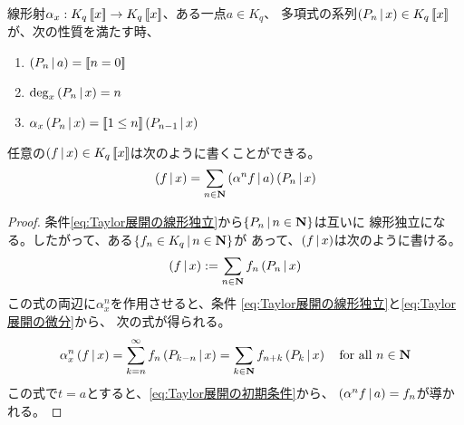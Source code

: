 {	\begin{proposition}[Taylor展開]\label{prop:Taylor展開} %
		線形射$\alpha_x:K_q\mathinner{[\![{x}]\!]}\to K_q\mathinner{[\![{x}]\!]}$、ある一点$a\in K_q$、
		多項式の系列$\mathinner{({P_n{\,|\,}x})}\in K_q\mathinner{[\![{x}]\!]}$が、次の性質を満たす時、
		\begin{enumerate}\setlength{\itemsep}{-1mm} %
			\item\label{eq:Taylor展開の初期条件} $\mathinner{({P_n{\,|\,}a})}=\mathinner{[\![n=0]\!]}$
			\item\label{eq:Taylor展開の線形独立} $\deg_x\mathinner{({P_n{\,|\,}x})}=n$
			\item\label{eq:Taylor展開の微分} $\alpha_x\mathinner{({P_n{\,|\,}x})}=\mathinner{[\![1\le n]\!]}\mathinner{({P_{n-1}{\,|\,}x})}$
		\end{enumerate} %
		任意の$\mathinner{({f{\,|\,}x})}\in K_q\mathinner{[\![{x}]\!]}$は次のように書くことができる。
		\begin{equation*}\begin{split}
			\mathinner{({f{\,|\,}x})} = \sum_{n\in\mathbf{N}}\mathinner{({\alpha^nf{\,|\,}a})}\mathinner{({P_n{\,|\,}x})}
		\end{split}\end{equation*}
	\end{proposition} %
	\begin{proof} %
		条件\ref{eq:Taylor展開の線形独立}から$\mathinner{\{{P_n{\,|\,}n\in\ensuremath{\mathbf{N}}}\}}$は互いに
		線形独立になる。したがって、ある$\mathinner{\{{f_n\in K_q{\,|\,}n\in\ensuremath{\mathbf{N}}}\}}$が
		あって、$\mathinner{({f{\,|\,}x})}$は次のように書ける。
		\begin{equation*}\begin{split}
			\mathinner{({f{\,|\,}x})} := \sum_{n\in\mathbf{N}} f_n\mathinner{({P_n{\,|\,}x})}
		\end{split}\end{equation*}
		この式の両辺に$\alpha_x^n$を作用させると、条件
		\ref{eq:Taylor展開の線形独立}と\ref{eq:Taylor展開の微分}から、
		次の式が得られる。
		\begin{equation*}\begin{split}
			\alpha_x^n\mathinner{({f{\,|\,}x})} = \sum_{k=n}^\infty f_n\mathinner{({P_{k-n}{\,|\,}x})}
			= \sum_{k\in\mathbf{N}} f_{n+k}\mathinner{({P_k{\,|\,}x})}
			\quad\text{for all } n\in\mathbf{N}
		\end{split}\end{equation*}
		この式で$t=a$とすると、\ref{eq:Taylor展開の初期条件}から、
		$\mathinner{({\alpha^nf{\,|\,}a})}=f_n$が導かれる。
	\end{proof} %

}
